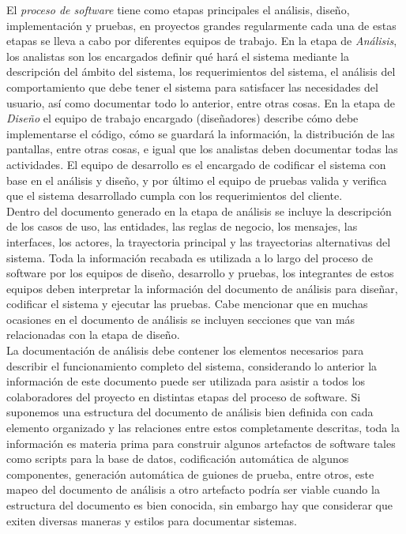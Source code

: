 
El \emph{proceso de software} tiene como etapas principales el análisis, diseño, implementación y pruebas, 
en proyectos grandes regularmente cada una de estas etapas se lleva a cabo por diferentes equipos
de trabajo. En la etapa de \emph{Análisis}, los analistas son los encargados definir qué hará el sistema
mediante la descripción del ámbito del sistema, los requerimientos del sistema, el análisis del comportamiento que debe tener el sistema para satisfacer 
las necesidades del usuario, así como documentar todo lo anterior, entre otras cosas. En la etapa de \emph{Diseño} el equipo de trabajo encargado
(diseñadores) describe cómo debe implementarse el código, cómo se guardará la información, la distribución de las pantallas, entre otras cosas, e igual
que los analistas deben documentar todas las actividades. El equipo de desarrollo es el encargado de codificar el sistema con base en el análisis 
y diseño, y por último el equipo de pruebas valida y verifica que el sistema desarrollado cumpla con los requerimientos del cliente.\\

Dentro del documento generado en la etapa de análisis se incluye la descripción de los casos de uso, las entidades, 
las reglas de negocio, los mensajes, las interfaces, los actores, la trayectoria principal
y las trayectorias alternativas del sistema. Toda la información recabada es utilizada a lo largo del proceso de software 
por los equipos de diseño, desarrollo y pruebas, los integrantes de estos
equipos deben interpretar la información del documento de análisis para diseñar, codificar el sistema y ejecutar las pruebas. 
Cabe mencionar que en muchas ocasiones en el documento de análisis se incluyen secciones que van más relacionadas con la etapa de diseño.\\

La documentación de análisis debe contener los elementos necesarios para describir el funcionamiento completo del sistema, considerando lo anterior
la información de este documento puede ser utilizada para asistir a todos los colaboradores del proyecto en distintas etapas
del proceso de software. Si suponemos una estructura del documento de análisis
bien definida con cada elemento organizado y las relaciones entre estos completamente descritas, toda la información es materia prima para construir algunos
artefactos de software tales como scripts para la base de datos, codificación automática de algunos componentes, generación automática de guiones de prueba, entre otros,
este mapeo del documento de análisis a otro artefacto podría ser viable cuando la estructura del documento es bien conocida, 
sin embargo hay que considerar que exiten diversas maneras y estilos para 
documentar sistemas.\\

